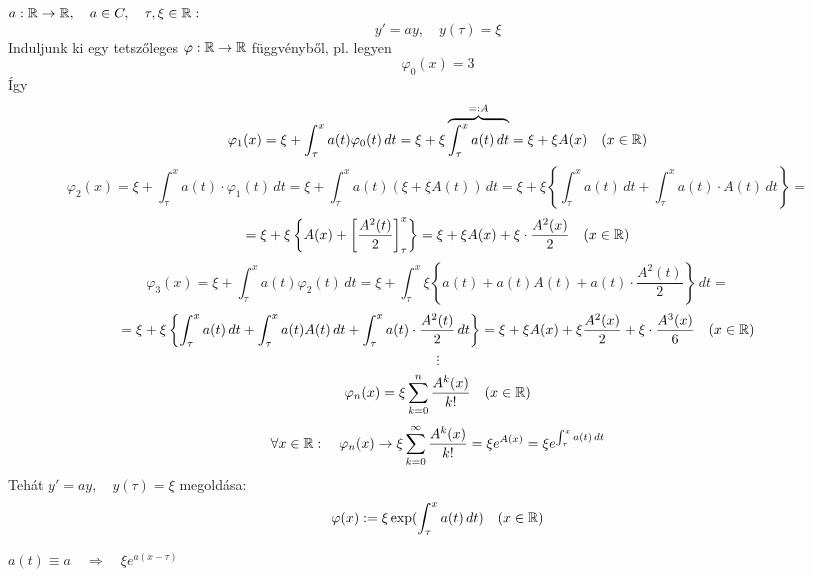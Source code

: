 \documentclass[a4paper,11.5pt]{article}
\begin{document}
	\begin{example}
		$a:\mathbb{R}\to\mathbb{R},\quad a\in C,\quad \tau,\xi\in\mathbb{R}:$
		\[ y'=ay,\quad y(\tau)=\xi \]
		Induljunk ki egy tetszőleges $\varphi:\mathbb{R}\to\mathbb{R}$ függvényből, pl. legyen 
		\[ \varphi_0(x)=3 \]
		Így
		\[ \varphi_1(x)=\xi+\int_{\tau}^{x}a(t)\varphi_0(t)\,dt=\xi+\xi\overbrace{\int_{\tau}^{x}a(t)\,dt}^{=:A}=\xi+\xi A(x)\quad (x\in\mathbb{R}) \]
		\[ \varphi_2(x)=\xi+\int_{\tau}^{x}a(t)\cdot\varphi_1(t)\,dt=\xi+\int_{\tau}^{x}a(t)(\xi+\xi A(t))\,dt=\xi+\xi\left\{ \int_{\tau}^{x}a(t)\,dt+\int_{\tau}^{x}a(t)\cdot A(t)\,dt \right\}= \]
		\[ =\xi + \xi\left\{ A(x)+\left[\frac{A^2(t)}{2}\right]_\tau^x \right\}=\xi+\xi A(x)+\xi\cdot\frac{A^2(x)}{2}\quad (x\in\mathbb{R}) \]
		\[ \varphi_3(x)=\xi+\int_{\tau}^{x}a(t)\varphi_2(t)\,dt=\xi + \int_{\tau}^{x}\xi\left\{a(t)+a(t)A(t)+a(t)\cdot\frac{A^2(t)}{2} \right\}\,dt= \]
		\[ =\xi + \xi\left\{ \int_{\tau}^{x}a(t)\,dt+\int_{\tau}^{x}a(t)A(t)\,dt+\int_{\tau}^{x}a(t)\cdot\frac{A^2(t)}{2}\,dt \right\}=\xi+\xi A(x)+\xi\frac{A^2(x)}{2}+\xi\cdot\frac{A^3(x)}{6}\quad (x\in\mathbb{R}) \]
		\[\vdots \]
		\[ \varphi_n(x)=\xi\sum_{k=0}^n\frac{A^k(x)}{k!}\quad (x\in\mathbb{R}) \]
		\[ \forall x\in\mathbb{R}:\quad \varphi_n(x)\to\xi\sum_{k=0}^\infty\frac{A^k(x)}{k!}=\xi e^{A(x)}=\xi e^{\int_{\tau}^{x}a(t)\,dt} \]
		Tehát $y'=ay,\quad y(\tau)=\xi$ megoldása:
		\[\varphi(x):=\xi\exp(\int_{\tau}^{x}a(t)\,dt)\quad (x\in\mathbb{R}) \]
	\end{example}
	\begin{note}
		$a(t)\equiv a\quad \Rightarrow\quad \xi e^{a(x-\tau)}$
	\end{note}
\end{document}
